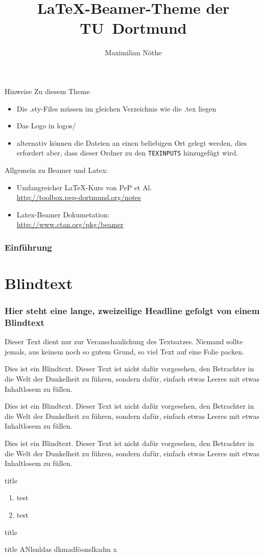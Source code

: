 \documentclass[aspectratio=1610, professionalfonts, 9pt]{beamer}
\title{\LaTeX-Beamer-Theme der TU~Dortmund}
\author[M.~Nöthe]{Maximilian Nöthe}
\institute[Experimental Physics 5]{Names des Lehrstuhls \\  Name der Fakultät}
\begin{document}
\maketitle

\begin{frame}{Hinweise}
  Zu diesem Theme
  \begin{itemize}
    \item Die .sty-Files müssen im gleichen Verzeichnis wie die .tex liegen
    \item Das Logo in logos/
    \item alternativ können die Dateien an einen beliebigen Ort gelegt werden,
    dies erfordert aber, dass dieser Ordner zu den \texttt{TEXINPUTS} hinzugefügt wird.
  \end{itemize}
  Allgemein zu Beamer und Latex:
  \begin{itemize}
    \item Umfangreicher \LaTeX-Kurs von PeP et Al. \\
      \url{http://toolbox.pep-dortmund.org/notes}
    \item Latex-Beamer Dokumetation:\\
    \url{http://www.ctan.org/pkg/beamer}
  \end{itemize}
\end{frame}

\begin{frame}
    \frametitle{Einführung}
    \tableofcontents[pausesections]
\end{frame}

\section{Blindtext}
\begin{frame}
	\frametitle{Hier steht eine lange, zweizeilige Headline
		\newline gefolgt von einem Blindtext}
Dieser Text dient nur zur Veranschaulichung des Textsatzes. Niemand sollte jemals, aus keinem noch so gutem Grund, so viel Text auf eine Folie packen.

Dies ist ein Blindtext. Dieser Text ist nicht dafür vorgesehen, den Betrachter in die Welt der Dunkelheit zu führen, sondern dafür, einfach etwas Leeres mit etwas Inhaltlosem zu füllen.

Dies ist ein Blindtext. Dieser Text ist nicht dafür vorgesehen, den Betrachter in die Welt der Dunkelheit zu führen, sondern dafür, einfach etwas Leeres mit etwas Inhaltlosem zu füllen.

Dies ist ein Blindtext. Dieser Text ist nicht dafür vorgesehen, den Betrachter in die Welt der Dunkelheit zu führen, sondern dafür, einfach etwas Leeres mit etwas Inhaltlosem zu füllen.
\end{frame}

\begin{frame}{title}
  \begin{enumerate}
    \item test
    \item test
  \end{enumerate}
\end{frame}

\begin{frame}{title}
  \begin{block}{title}
    ANlsnldas dkmadföonslkadm x
  \end{block}
\end{frame}
\end{document}
